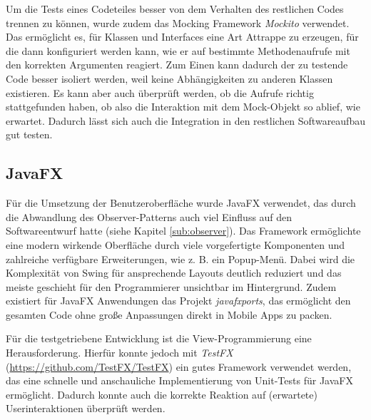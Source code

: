 Um die Tests eines Codeteiles besser von dem Verhalten des restlichen Codes trennen zu können, wurde zudem das Mocking Framework \emph{Mockito} verwendet. Das ermöglicht es, für Klassen und Interfaces eine Art Attrappe zu erzeugen, für die dann konfiguriert werden kann, wie er auf bestimmte Methodenaufrufe mit den korrekten Argumenten reagiert. Zum Einen kann dadurch der zu testende Code besser isoliert werden, weil keine Abhängigkeiten zu anderen Klassen existieren. Es kann aber auch überprüft werden, ob die Aufrufe richtig stattgefunden haben, ob also die Interaktion mit dem Mock-Objekt so ablief, wie erwartet. Dadurch lässt sich auch die Integration in den restlichen Softwareaufbau gut testen.


\subsection{JavaFX} %
\label{sub:javafx}
Für die Umsetzung der Benutzeroberfläche wurde JavaFX verwendet, das durch die Abwandlung des Observer-Patterns auch viel Einfluss auf den Softwareentwurf hatte (siehe Kapitel \ref{sub:observer}). Das Framework ermöglichte eine modern wirkende Oberfläche durch viele vorgefertigte Komponenten und zahlreiche verfügbare Erweiterungen, wie z. B. ein Popup-Menü. Dabei wird die Komplexität von Swing für ansprechende Layouts deutlich reduziert und das meiste geschieht für den Programmierer unsichtbar im Hintergrund. Zudem existiert für JavaFX Anwendungen das Projekt \emph{javafxports}, das ermöglicht den gesamten Code ohne große Anpassungen direkt in Mobile Apps zu packen.

Für die testgetriebene Entwicklung ist die View-Programmierung eine Herausforderung. Hierfür konnte jedoch mit \emph{TestFX} (\url{https://github.com/TestFX/TestFX}) ein gutes Framework verwendet werden, das eine schnelle und anschauliche Implementierung von Unit-Tests für JavaFX ermöglicht. Dadurch konnte auch die korrekte Reaktion auf (erwartete) Userinteraktionen überprüft werden.

